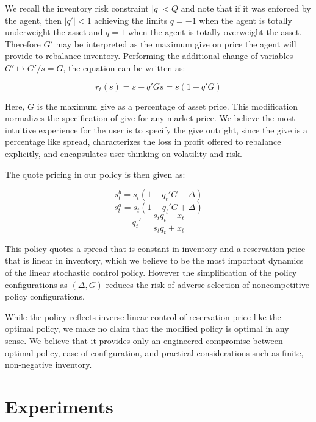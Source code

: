\documentclass{article}
\begin{document}
We recall the inventory risk constraint $|q| < Q$ and note that if it was enforced by the agent, then $|q'| < 1$ achieving the limits $q = -1$ when the agent is totally underweight the asset and $q = 1$ when the agent is totally overweight the asset. Therefore $G'$ may be interpreted as the maximum give on price the agent will provide to rebalance inventory. Performing the additional change of variables $G' \mapsto G'/s = G$, the equation can be written as:

\begin{equation}
\label{eq:retailpricepercentage}
r_t(s) = s - q' G s = s (1 - q' G)
\end{equation}

Here, $G$ is the maximum give as a percentage of asset price. This modification normalizes the specification of give for any market price. We believe the most intuitive experience for the user is to specify the give outright, since the give is a percentage like spread, characterizes the loss in profit offered to rebalance explicitly, and encapsulates user thinking on volatility and risk.

The quote pricing in our policy is then given as:

\begin{equation}
\label{eq:retailbid}
s^b_t = s_t (1 - q_t' G - \Delta)
\end{equation}
\begin{equation}
\label{eq:retailask}
s^a_t = s_t (1 - q_t' G + \Delta)
\end{equation}
\begin{equation}
\label{eq:retailqprime}
q_t' = \frac{s_t q_t - x_t}{s_t q_t + x_t}
\end{equation}

This policy quotes a spread that is constant in inventory and a reservation price that is linear in inventory, which we believe to be the most important dynamics of the linear stochastic control policy. However the simplification of the policy configurations as $(\Delta, G)$ reduces the risk of adverse selection of noncompetitive policy configurations.

While the policy reflects inverse linear control of reservation price like the optimal policy, we make no claim that the modified policy is optimal in any sense. We believe that it provides only an engineered compromise between optimal policy, ease of configuration, and practical considerations such as finite, non-negative inventory.

\section{Experiments}
\label{sec:experiments}
\end{document}
